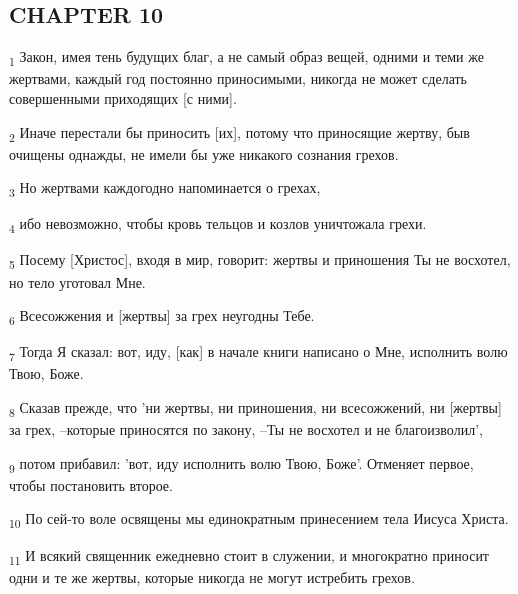 \subsection{CHAPTER 10}
\begin{tcolorbox}
\textsubscript{1} Закон, имея тень будущих благ, а не самый образ вещей, одними и теми же жертвами, каждый год постоянно приносимыми, никогда не может сделать совершенными приходящих [с ними].
\end{tcolorbox}
\begin{tcolorbox}
\textsubscript{2} Иначе перестали бы приносить [их], потому что приносящие жертву, быв очищены однажды, не имели бы уже никакого сознания грехов.
\end{tcolorbox}
\begin{tcolorbox}
\textsubscript{3} Но жертвами каждогодно напоминается о грехах,
\end{tcolorbox}
\begin{tcolorbox}
\textsubscript{4} ибо невозможно, чтобы кровь тельцов и козлов уничтожала грехи.
\end{tcolorbox}
\begin{tcolorbox}
\textsubscript{5} Посему [Христос], входя в мир, говорит: жертвы и приношения Ты не восхотел, но тело уготовал Мне.
\end{tcolorbox}
\begin{tcolorbox}
\textsubscript{6} Всесожжения и [жертвы] за грех неугодны Тебе.
\end{tcolorbox}
\begin{tcolorbox}
\textsubscript{7} Тогда Я сказал: вот, иду, [как] в начале книги написано о Мне, исполнить волю Твою, Боже.
\end{tcolorbox}
\begin{tcolorbox}
\textsubscript{8} Сказав прежде, что 'ни жертвы, ни приношения, ни всесожжений, ни [жертвы] за грех, --которые приносятся по закону, --Ты не восхотел и не благоизволил',
\end{tcolorbox}
\begin{tcolorbox}
\textsubscript{9} потом прибавил: 'вот, иду исполнить волю Твою, Боже'. Отменяет первое, чтобы постановить второе.
\end{tcolorbox}
\begin{tcolorbox}
\textsubscript{10} По сей-то воле освящены мы единократным принесением тела Иисуса Христа.
\end{tcolorbox}
\begin{tcolorbox}
\textsubscript{11} И всякий священник ежедневно стоит в служении, и многократно приносит одни и те же жертвы, которые никогда не могут истребить грехов.
\end{tcolorbox}
